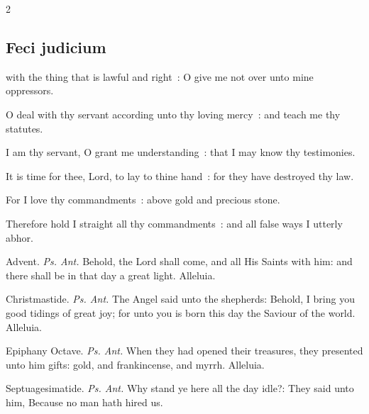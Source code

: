 \begin{multicols}{2}

\subsection{Feci judicium}


 with the thing that is lawful and right~: O give me not over unto mine oppressors.\par
{}
O deal with thy servant according unto thy loving mercy~: and teach me thy statutes.\par
{}I am thy servant, O grant me understanding~: that I may know thy testimonies.\par
{}It is time for thee, Lord, to lay to thine hand~: for they have destroyed thy law.\par
{}For I love thy commandments~: above gold and precious stone.\par
{}Therefore hold I straight all thy commandments~: and all false ways I utterly abhor.\\
\par\noindent
{\color{RubricRed}Advent.} \textit{Ps. Ant.} Behold, the Lord shall come, and all His Saints with him: and there shall be in that day a great light. Alleluia.
\par\noindent
{\color{RubricRed}Christmastide.} \textit{Ps. Ant.} The Angel said unto the shepherds: Behold, I bring you good tidings of great joy; for unto you is born this day the Saviour of the world. Alleluia.
\par\noindent
{\color{RubricRed}Epiphany Octave.} \textit{Ps. Ant.} When they had opened their treasures, they presented unto him gifts: gold, and frankincense, and myrrh. Alleluia.
\par\noindent
{\color{RubricRed}Septuagesimatide.} \textit{Ps. Ant.} Why stand ye here all the day idle?: They said unto him, Because no man hath hired us.

\end{multicols}
